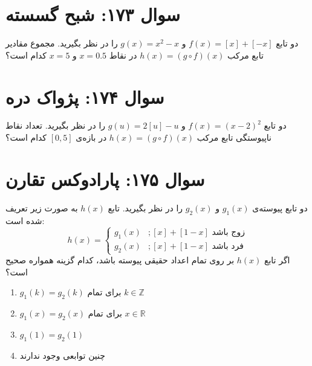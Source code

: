 \documentclass[12pt]{article}
\begin{document}
\section*{سوال ۱۷۳: شبح گسسته}
دو تابع \(f(x) = [x] + [-x]\) و \(g(x) = x^2 - x\) را در نظر بگیرید. مجموع مقادیر تابع مرکب \(h(x) = (g \circ f)(x)\) در نقاط \(x=0.5\) و \(x=5\) کدام است؟

\vspace{1cm}
\hrulefill
\vspace{1cm}

\section*{سوال ۱۷۴: پژواک دره}
دو تابع \(f(x) = (x-2)^2\) و \(g(u) = 2[u] - u\) را در نظر بگیرید. تعداد نقاط ناپیوستگی تابع مرکب \(h(x) = (g \circ f)(x)\) در بازه‌ی \( [0, 5] \) کدام است؟

\vspace{1cm}
\hrulefill
\vspace{1cm}

\section*{سوال ۱۷۵: پارادوکس تقارن}
دو تابع پیوسته‌ی \(g_1(x)\) و \(g_2(x)\) را در نظر بگیرید. تابع \(h(x)\) به صورت زیر تعریف شده است:
\begin{displaymath}
	h(x) = 
	\begin{cases}
		g_1(x) & ;  [x] + [1-x] \text{ زوج باشد} \\
		g_2(x) & ; [x] + [1-x] \text{ فرد باشد}
	\end{cases}
\end{displaymath}
اگر تابع \(h(x)\) بر روی تمام اعداد حقیقی پیوسته باشد، کدام گزینه همواره صحیح است؟
\begin{enumerate}[label=(\arabic*)]
	\item \(g_1(k) = g_2(k)\) برای تمام \(k \in \mathbb{Z}\)
	\item \(g_1(x) = g_2(x)\) برای تمام \(x \in \mathbb{R}\)
	\item \(g_1(1) = g_2(1)\)
	\item چنین توابعی وجود ندارند
\end{enumerate}
\end{document}
